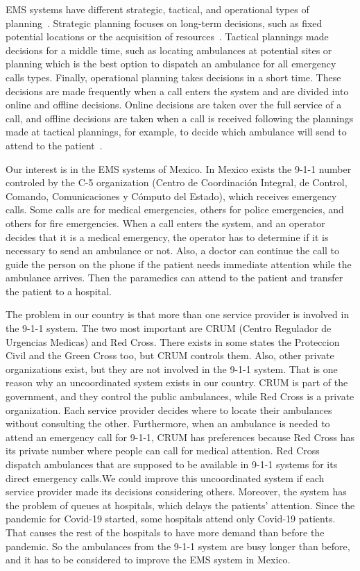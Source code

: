 EMS systems have different strategic, tactical, and operational types of plan\-ning~\cite{galvao2008emergency}. Strategic planning focuses on long-term decisions, such as fixed potential locations or the acquisition of resources~\cite{aboueljinane2013review}. Tactical plannings made decisions for a middle time, such as locating ambulances at potential sites or planning which is the best option to dispatch an ambulance for all emergency calls types. Finally, operational planning takes decisions in a short time. These decisions are made frequently when a call enters the system and are divided into online and offline decisions. Online decisions are taken over the full service of a call, and offline decisions are taken when a call is received following the plannings made at tactical plannings, for example, to decide which ambulance will send to attend to the pa\-tient~\cite{hulshof2012taxonomic}.

Our interest is in the EMS systems of Mexico. In Mexico exists the 9-1-1 number controled by the C-5 organization (Centro de Coordinación Integral, de Control, Comando, Comunicaciones y Cómputo del Estado), which receives emergency calls. Some calls are for medical emergencies, others for police e\-mer\-gen\-cies, and others for fire emergencies. When a call enters the system, and an operator decides that it is a medical emergency, the operator has to determine if it is necessary to send an ambulance or not. Also, a doctor can continue the call to guide the person on the phone if the patient needs immediate attention while the ambulance arrives. Then the paramedics can attend to the patient and transfer the patient to a hospital.

The problem in our country is that more than one service provider is involved in the 9-1-1 system. The two most important are CRUM (Centro Regulador de Urgencias Medicas) and Red Cross. There exists in some states the Proteccion Civil and the Green Cross too, but CRUM controls them. Also, other private organizations exist, but they are not involved in the 9-1-1 system. That is one reason why an uncoordinated system exists in our country. CRUM is part of the government, and they control the public ambulances, while Red Cross is a private organization. Each service provider decides where to locate their ambulances without consulting the other. Furthermore, when an ambulance is needed to attend an emergency call for 9-1-1, CRUM has preferences because Red Cross has its private number where people can call for medical attention. Red Cross dispatch ambulances that are supposed to be available in 9-1-1 systems for its direct emergency calls.We could improve this uncoordinated system if each service provider made its decisions considering others. Moreover, the system has the problem of queues at hospitals, which delays the patients' attention. Since the pandemic for Covid-19 started, some hospitals attend only Covid-19 patients. That causes the rest of the hospitals to have more demand than before the pandemic. So the ambulances from the 9-1-1 system are busy longer than before, and it has to be considered to improve the EMS system in Mexico.

